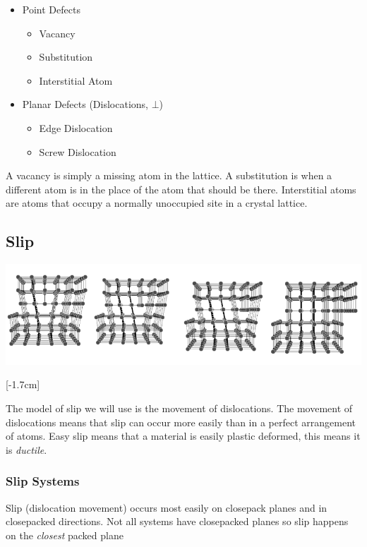 \documentclass[12pt]{article}
\begin{document}
\begin{itemize}
  \item Point Defects
    \begin{itemize}
      \item Vacancy
      \item Substitution
      \item Interstitial Atom
    \end{itemize}
  \item Planar Defects (Dislocations, $\bot$)
    \begin{itemize}
      \item Edge Dislocation
      \item Screw Dislocation
    \end{itemize}
\end{itemize}

A vacancy is simply a missing atom in the lattice.
A substitution is when a different atom is in the place of the atom that should be there. 
Interstitial atoms are atoms that occupy a normally unoccupied site in a crystal lattice.

\subsection{Slip}
\begin{center}
  \includegraphics[scale=0.2]{slip}
\end{center}

[-1.7cm]

The model of slip we will use is the movement of dislocations.
The movement of dislocations means that slip can occur more easily than in a perfect arrangement of atoms.
Easy slip means that a material is easily plastic deformed, this means it is \textit{ductile}.


\subsubsection{Slip Systems}
Slip (dislocation movement) occurs most easily on closepack planes and in closepacked directions.
Not all systems have closepacked planes so slip happens on the \textit{closest} packed plane  
\end{document}

